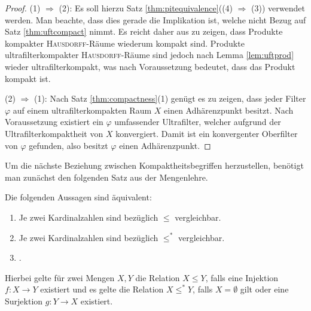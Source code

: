 \begin{proof}
  (1)  $\Rightarrow$  (2):
  Es soll hierzu Satz \ref{thm:pitequivalence}((4) $\Rightarrow$ (3)) verwendet werden.
  Man beachte, dass dies gerade die Implikation ist, welche nicht Bezug auf Satz \ref{thm:uftcompact} nimmt.
  Es reicht daher aus zu zeigen, dass Produkte kompakter \textsc{Hausdorff}-Räume wiederum kompakt sind. 
  Produkte ultrafilterkompakter \textsc{Hausdorff}-Räume sind jedoch nach Lemma \ref{lem:uftprod} wieder ultrafilterkompakt, was nach Voraussetzung bedeutet, dass das Produkt kompakt ist.

  (2) $\Rightarrow$ (1):
  Nach Satz \ref{thm:compactness}(1) genügt es zu zeigen, dass jeder Filter $\varphi$ auf einem ultrafilterkompakten Raum $X$ einen Adhärenzpunkt besitzt.
  Nach Voraussetzung existiert ein $\varphi$ umfassender Ultrafilter, welcher aufgrund der Ultrafilterkompaktheit von $X$ konvergiert.
  Damit ist ein konvergenter Oberfilter von $\varphi$ gefunden, also besitzt $\varphi$ einen Adhärenzpunkt.
\end{proof}

Um die nächste Beziehung zwischen Kompaktheitsbegriffen herzustellen, benötigt man zunächst den folgenden Satz aus der Mengenlehre.

\begin{thm}
  \label{thm:comparablecardinal}
  Die folgenden Aussagen sind äquivalent:
  \begin{enumerate}[(1)]
    \item Je zwei Kardinalzahlen sind bezüglich $\leq$ vergleichbar.
    \item Je zwei Kardinalzahlen sind bezüglich $\leq^*$ vergleichbar.
    \item \AC.
  \end{enumerate}
  Hierbei gelte für zwei Mengen $X,Y$ die Relation $X \leq Y$, falls eine Injektion $f \colon X \to Y$ existiert und es gelte die Relation $X \leq^* Y$, falls $X = \emptyset$ gilt oder eine Surjektion $g \colon Y \to X$ existiert.
\end{thm}

